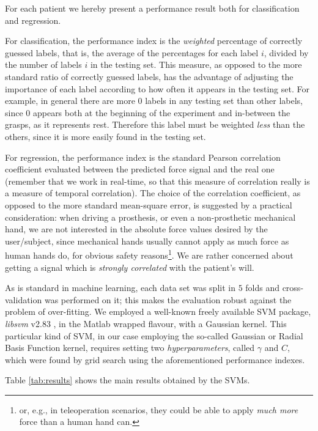 For each patient we hereby present a performance result both for
classification and regression.

For classification, the performance index is the \emph{weighted}
percentage of correctly guessed labels, that is, the average of the
percentages for each label $i$, divided by the number of labels $i$ in
the testing set. This measure, as opposed to the more standard ratio
of correctly guessed labels, has the advantage of adjusting the
importance of each label according to how often it appears in the
testing set. For example, in general there are more $0$ labels in any
testing set than other labels, since $0$ appears both at the beginning
of the experiment and in-between the grasps, as it represents
rest. Therefore this label must be weighted \emph{less} than the
others, since it is more easily found in the testing set.

For regression, the performance index is the standard Pearson
correlation coefficient evaluated between the predicted force signal
and the real one (remember that we work in real-time, so that this
measure of correlation really is a measure of temporal
correlation). The choice of the correlation coefficient, as opposed to
the more standard mean-square error, is suggested by a practical
consideration: when driving a prosthesis, or even a non-prosthetic
mechanical hand, we are not interested in the absolute force values
desired by the user/subject, since mechanical hands usually cannot
apply as much force as human hands do, for obvious safety
reasons\footnote{or, e.g., in teleoperation scenarios, they could be
able to apply \emph{much more} force than a human hand can.}. We are
rather concerned about getting a signal which is \emph{strongly
correlated} with the patient's will.

As is standard in machine learning, each data set was split in $5$
folds and cross-validation was performed on it; this makes the
evaluation robust against the problem of over-fitting. We employed a
well-known freely available SVM package, \emph{libsvm} v2.83
\cite{ChangL01}, in the Matlab wrapped flavour, with a Gaussian
kernel. This particular kind of SVM, in our case employing the
so-called Gaussian or Radial Basis Function kernel, requires setting
two \emph{hyperparameters}, called $\gamma$ and $C$, which were found
by grid search using the aforementioned performance indexes.

Table \ref{tab:results} shows the main results obtained by the SVMs.

